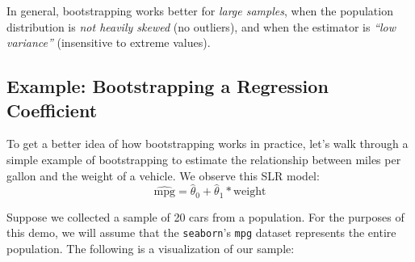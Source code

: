 \documentclass[
  letterpaper,
  DIV=11,
  numbers=noendperiod]{scrreprt}
\begin{document}
\begin{tcolorbox}[enhanced jigsaw, arc=.35mm, left=2mm, toprule=.15mm, leftrule=.75mm, bottomrule=.15mm, colframe=quarto-callout-note-color-frame, rightrule=.15mm, colbacktitle=quarto-callout-note-color!10!white, opacitybacktitle=0.6, coltitle=black, bottomtitle=1mm, colback=white, toptitle=1mm, title=\textcolor{quarto-callout-note-color}{\faInfo}\hspace{0.5em}{Bootstrap limitations}, breakable, opacityback=0, titlerule=0mm]

In general, bootstrapping works better for \emph{large samples}, when
the population distribution is \emph{not heavily skewed} (no outliers),
and when the estimator is \emph{``low variance''} (insensitive to
extreme values).

\end{tcolorbox}

\subsection{Example: Bootstrapping a Regression
Coefficient}\label{example-bootstrapping-a-regression-coefficient}

To get a better idea of how bootstrapping works in practice, let's walk
through a simple example of bootstrapping to estimate the relationship
between miles per gallon and the weight of a vehicle. We observe this
SLR model: \[ 
\widehat{\text{mpg}} = \hat{\theta}_0 + \hat{\theta}_1 * \text{weight}
\]

Suppose we collected a sample of 20 cars from a population. For the
purposes of this demo, we will assume that the \texttt{seaborn}'s
\texttt{mpg} dataset represents the entire population. The following is
a visualization of our sample:
\end{document}
